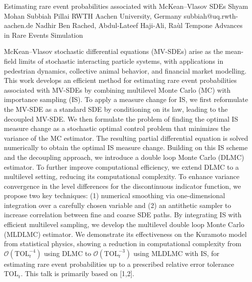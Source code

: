 \begin{talk}
  {Estimating rare event probabilities associated with McKean--Vlasov SDEs}%
  {Shyam Mohan Subbiah Pillai}%
  {RWTH Aachen University, Germany}%
  {subbiah@uq.rwth-aachen.de}%
  {Nadhir Ben Rached, Abdul-Lateef Haji-Ali, Ra\`ul Tempone}%
  {Advances in Rare Events Simulation}%
    
   
McKean--Vlasov stochastic differential equations (MV-SDEs) arise as the mean-field limits of stochastic interacting particle systems, with applications in pedestrian dynamics, collective animal behavior, and financial market modelling. This work develops an efficient method for estimating rare event probabilities associated with MV-SDEs by combining multilevel Monte Carlo (MC) with importance sampling (IS). To apply a measure change for IS, we first reformulate the MV-SDE as a standard SDE by conditioning on its law, leading to the decoupled MV-SDE. We then formulate the problem of finding the optimal IS measure change as a stochastic optimal control problem that minimizes the variance of the MC estimator. The resulting partial differential equation is solved numerically to obtain the optimal IS measure change. Building on this IS scheme and the decoupling approach, we introduce a double loop Monte Carlo (DLMC) estimator. To further improve computational efficiency, we extend DLMC to a multilevel setting, reducing its computational complexity. To enhance variance convergence in the level differences for the discontinuous indicator function, we propose two key techniques: (1) numerical smoothing via one-dimensional integration over a carefully chosen variable and (2) an antithetic sampler to increase correlation between fine and coarse SDE paths. By integrating IS with efficient multilevel sampling, we develop the multilevel double loop Monte Carlo (MLDLMC) estimator. We demonstrate its effectiveness on the Kuramoto model from statistical physics, showing a reduction in computational complexity from $\mathcal{O}(\mathrm{TOL}_\mathrm{r}^{-4})$ using DLMC to $\mathcal{O}(\mathrm{TOL}_\mathrm{r}^{-3})$ using MLDLMC with IS, for estimating rare event probabilities up to a prescribed relative error tolerance $\mathrm{TOL}_\mathrm{r}$. This talk is primarily based on [1,2].

\medskip


\end{talk}

